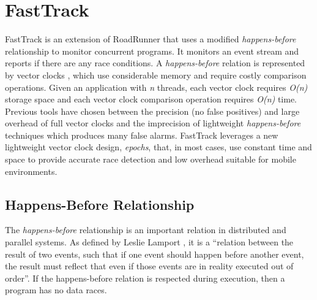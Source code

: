 \documentclass{acm_proc_article-sp}
\begin{document}
\section{FastTrack}
FastTrack is an extension of RoadRunner that uses a modified \emph{happens-before} relationship to monitor concurrent programs. It monitors an event stream and reports if there are any race conditions. A \emph{happens-before} relation is represented by vector clocks \cite{citeulike}, which use considerable memory and require costly comparison operations. Given an application with  \emph{n} threads, each vector clock requires \emph{O(n)} storage space and each vector clock comparison operation requires \emph{O(n)} time. Previous tools have chosen between the precision (no false positives) and large overhead of full vector clocks and the imprecision of lightweight \emph{happens-before} techniques which produces many false alarms. FastTrack leverages a new lightweight vector clock design, \emph{epochs}, that, in most cases, use constant time and space to provide accurate race detection and low overhead suitable for mobile environments.

\subsection{Happens-Before Relationship}
The \emph{happens-before} relationship is an important relation in distributed and parallel systems. As defined by Leslie Lamport \cite{Lamport1978}, it is a ``relation between the result of two events, such that if one event should happen before another event, the result must reflect that even if those events are in reality executed out of order''. If the happens-before relation is respected during execution, then a program has no data races. 
\end{document}
